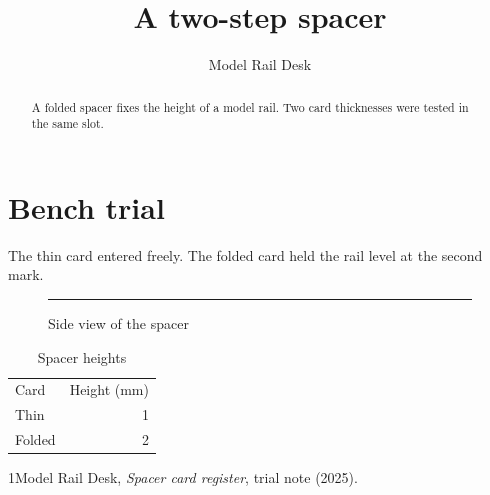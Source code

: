 \documentclass{amsart}
\begin{document}
\title{A two-step spacer}\author{Model Rail Desk}\address{Paper Model Workshop}\begin{abstract}A folded spacer fixes the height of a model rail. Two card thicknesses were tested in the same slot.\end{abstract}\maketitle
\section{Bench trial}
The thin card entered freely. The folded card held the rail level at the second mark.
\begin{figure}[ht]\centering\rule{28mm}{2mm}\caption{Side view of the spacer}\end{figure}
\begin{table}[ht]\centering\begin{tabular}{lr}Card&Height (mm)\\Thin&1\\Folded&2\end{tabular}\caption{Spacer heights}\end{table}
\begin{thebibliography}{1}Model Rail Desk, \emph{Spacer card register}, trial note (2025).\end{thebibliography}
\end{document}
